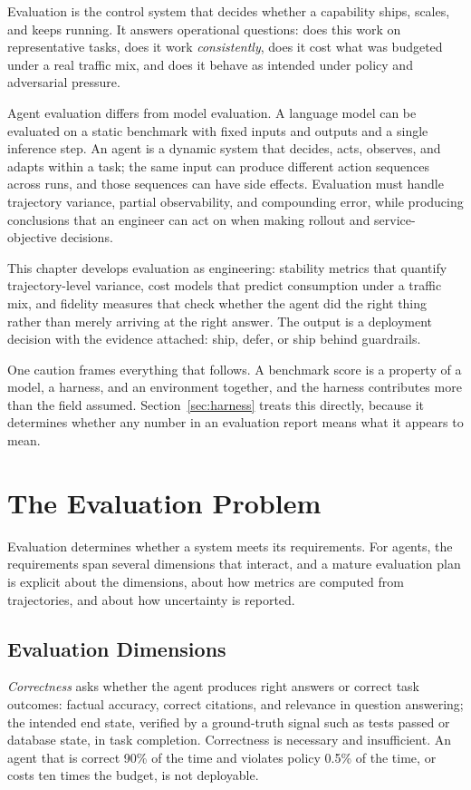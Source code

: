 \documentclass[11pt]{book}
\begin{document}
Evaluation is the control system that decides whether a capability ships, scales, and keeps running. It answers operational questions: does this work on representative tasks, does it work \textit{consistently}, does it cost what was budgeted under a real traffic mix, and does it behave as intended under policy and adversarial pressure.

Agent evaluation differs from model evaluation. A language model can be evaluated on a static benchmark with fixed inputs and outputs and a single inference step. An agent is a dynamic system that decides, acts, observes, and adapts within a task; the same input can produce different action sequences across runs, and those sequences can have side effects. Evaluation must handle trajectory variance, partial observability, and compounding error, while producing conclusions that an engineer can act on when making rollout and service-objective decisions.

This chapter develops evaluation as engineering: stability metrics that quantify trajectory-level variance, cost models that predict consumption under a traffic mix, and fidelity measures that check whether the agent did the right thing rather than merely arriving at the right answer. The output is a deployment decision with the evidence attached: ship, defer, or ship behind guardrails.

One caution frames everything that follows. A benchmark score is a property of a model, a harness, and an environment together, and the harness contributes more than the field assumed. Section~\ref{sec:harness} treats this directly, because it determines whether any number in an evaluation report means what it appears to mean.

\section{The Evaluation Problem}

Evaluation determines whether a system meets its requirements. For agents, the requirements span several dimensions that interact, and a mature evaluation plan is explicit about the dimensions, about how metrics are computed from trajectories, and about how uncertainty is reported.

\subsection{Evaluation Dimensions}

\textit{Correctness} asks whether the agent produces right answers or correct task outcomes: factual accuracy, correct citations, and relevance in question answering; the intended end state, verified by a ground-truth signal such as tests passed or database state, in task completion. Correctness is necessary and insufficient. An agent that is correct 90\% of the time and violates policy 0.5\% of the time, or costs ten times the budget, is not deployable.
\end{document}
